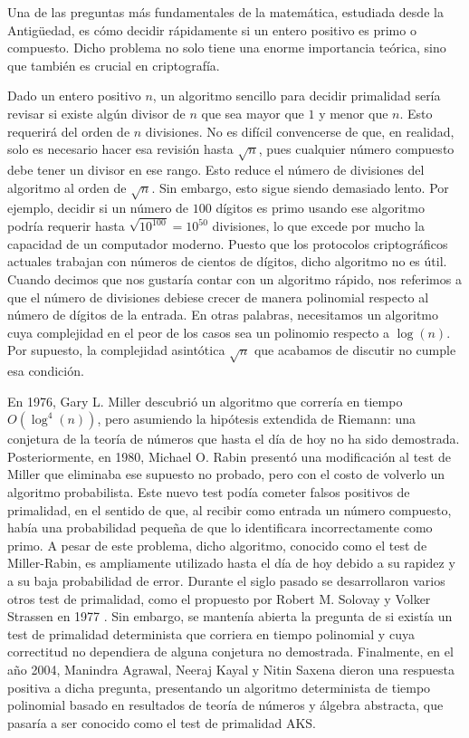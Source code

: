 Una de las preguntas más fundamentales de la matemática, estudiada desde la Antigüedad, es cómo decidir rápidamente si un entero positivo es primo o compuesto. Dicho problema no solo tiene una enorme importancia teórica, sino que también es crucial en criptografía.

Dado un entero positivo $n$, un algoritmo sencillo para decidir primalidad sería revisar si existe algún divisor de $n$ que sea mayor que $1$ y menor que $n$. Esto requerirá del orden de $n$ divisiones. No es difícil convencerse de que, en realidad, solo es necesario hacer esa revisión hasta $\sqrt{n}$, pues cualquier número compuesto debe tener un divisor en ese rango. Esto reduce el número de divisiones del algoritmo al orden de $\sqrt{n}$. Sin embargo, esto sigue siendo demasiado lento. Por ejemplo, decidir si un número de $100$ dígitos es primo usando ese algoritmo podría requerir hasta $\sqrt{10^{100}} = 10^{50}$ divisiones, lo que excede por mucho la capacidad de un computador moderno. Puesto que los protocolos criptográficos actuales trabajan con números de cientos de dígitos, dicho algoritmo no es útil. Cuando decimos que nos gustaría contar con un algoritmo rápido, nos referimos a que el número de divisiones debiese crecer de manera polinomial respecto al número de dígitos de la entrada. En otras palabras, necesitamos un algoritmo cuya complejidad en el peor de los casos sea un polinomio respecto a $\log(n)$. Por supuesto, la complejidad asintótica $\sqrt{n}$ que acabamos de discutir no cumple esa condición.

En 1976, Gary L. Miller \cite{MR480295} descubrió un algoritmo que correría en tiempo $O\left(\log^4(n) \right)$, pero asumiendo la hipótesis extendida de Riemann: una conjetura de la teoría de números que hasta el día de hoy no ha sido demostrada. Posteriormente, en 1980, Michael O. Rabin \cite{MR566880} presentó una modificación al test de Miller que eliminaba ese supuesto no probado, pero con el costo de volverlo un algoritmo probabilista. Este nuevo test podía cometer falsos positivos de primalidad, en el sentido de que, al recibir como entrada un número compuesto, había una probabilidad pequeña de que lo identificara incorrectamente como primo. A pesar de este problema, dicho algoritmo, conocido como el test de Miller-Rabin, es ampliamente utilizado hasta el día de hoy debido a su rapidez y a su baja probabilidad de error. Durante el siglo pasado se desarrollaron varios otros test de primalidad, como el propuesto por Robert M. Solovay y Volker Strassen en 1977 \cite{MR429721}. Sin embargo, se mantenía abierta la pregunta de si existía un test de primalidad determinista que corriera en tiempo polinomial y cuya correctitud no dependiera de alguna conjetura no demostrada.
Finalmente, en el año 2004, Manindra Agrawal, Neeraj Kayal y Nitin Saxena \cite{AKS04} dieron una respuesta positiva a dicha pregunta, presentando un algoritmo determinista de tiempo polinomial basado en resultados de teorí­a de números y álgebra abstracta, que pasaría a ser conocido como el test de primalidad AKS.

